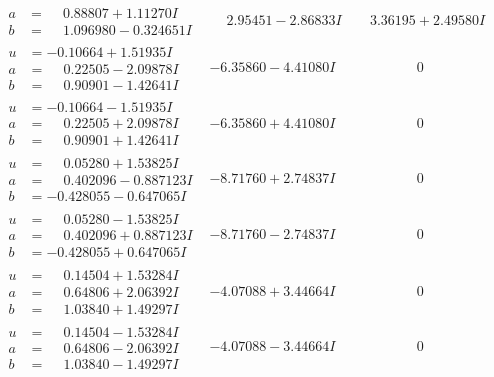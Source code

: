 \documentclass[1p]{elsarticle_modified}
\theoremstyle{definition}
\begin{document}
$$\begin{array}{c|c|c}
\begin{aligned}
a &= \phantom{-}0.88807 + 1.11270 I \\
b &= \phantom{-}1.096980 - 0.324651 I\end{aligned}
 & \phantom{-}2.95451 - 2.86833 I & \phantom{-}3.36195 + 2.49580 I \\ \hline\begin{aligned}
u &= -0.10664 + 1.51935 I \\
a &= \phantom{-}0.22505 - 2.09878 I \\
b &= \phantom{-}0.90901 - 1.42641 I\end{aligned}
 & -6.35860 - 4.41080 I & \phantom{-0.000000 } 0 \\ \hline\begin{aligned}
u &= -0.10664 - 1.51935 I \\
a &= \phantom{-}0.22505 + 2.09878 I \\
b &= \phantom{-}0.90901 + 1.42641 I\end{aligned}
 & -6.35860 + 4.41080 I & \phantom{-0.000000 } 0 \\ \hline\begin{aligned}
u &= \phantom{-}0.05280 + 1.53825 I \\
a &= \phantom{-}0.402096 - 0.887123 I \\
b &= -0.428055 - 0.647065 I\end{aligned}
 & -8.71760 + 2.74837 I & \phantom{-0.000000 } 0 \\ \hline\begin{aligned}
u &= \phantom{-}0.05280 - 1.53825 I \\
a &= \phantom{-}0.402096 + 0.887123 I \\
b &= -0.428055 + 0.647065 I\end{aligned}
 & -8.71760 - 2.74837 I & \phantom{-0.000000 } 0 \\ \hline\begin{aligned}
u &= \phantom{-}0.14504 + 1.53284 I \\
a &= \phantom{-}0.64806 + 2.06392 I \\
b &= \phantom{-}1.03840 + 1.49297 I\end{aligned}
 & -4.07088 + 3.44664 I & \phantom{-0.000000 } 0 \\ \hline\begin{aligned}
u &= \phantom{-}0.14504 - 1.53284 I \\
a &= \phantom{-}0.64806 - 2.06392 I \\
b &= \phantom{-}1.03840 - 1.49297 I\end{aligned}
 & -4.07088 - 3.44664 I & \phantom{-0.000000 } 0 \\ \hline\begin{aligned}

\end{aligned}
\end{array}$$
\end{document}

